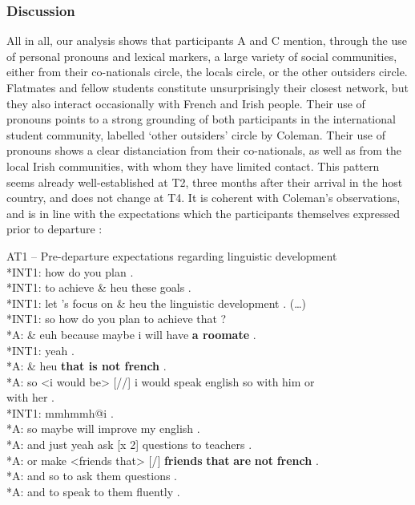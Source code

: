 \documentclass[output=paper]{langscibook}
\begin{document}
\subsubsection{Discussion}

All in all, our analysis shows that participants A and C mention, through the use of personal pronouns and lexical markers, a large variety of social communities, either from their co-nationals circle, the locals circle, or the other outsiders circle. Flatmates and fellow students constitute unsurprisingly their closest network, but they also interact occasionally with French and Irish people. Their use of pronouns points to a strong grounding of both participants in the international student community, labelled ‘other outsiders’ circle by Coleman. Their use of pronouns shows a clear distanciation from their co-nationals, as well as from the local Irish communities, with whom they have limited contact. This pattern seems already well-established at T2, three months after their arrival in the host country, and does not change at T4. It is coherent with Coleman's observations, and is in line with the expectations which the participants themselves expressed prior to departure :

\ea%
    \label{ex:18}
    AT1 – Pre-departure expectations regarding linguistic development\medskip\\
	*INT1: \tab how do you plan .\\
	*INT1: \tab to achieve \& heu these goals .\\
	*INT1: \tab  let 's focus on \& heu the linguistic development . (…)\\
	*INT1: \tab   so how do you plan to achieve that ?\\
	*A: \tab \& euh because maybe i will have \textbf{a roomate} .\\
	*INT1: \tab yeah .\\
	*A: \tab      \& heu \textbf{that is not french} .\\
	*A: \tab  so <i would be> [//] i would speak english so with him or \\ \tab with her .\\
	*INT1: \tab mmhmmh@i .\\
	*A: \tab so maybe will improve my english .\\
	*A: \tab and just yeah ask [x 2] questions to teachers .\\
	*A: \tab or make <friends that> [/] \textbf{friends} \textbf{that} \textbf{are} \textbf{not} \textbf{french} .\\
	*A: \tab and so to ask them questions .\\
	*A: \tab and to speak to them fluently .
	\z
\end{document}
